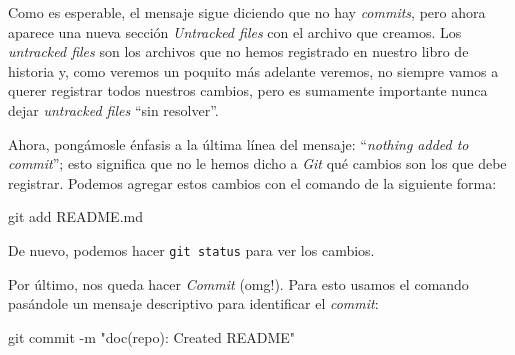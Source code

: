     Como es esperable, el mensaje sigue diciendo que no hay \textit{commits}, pero ahora aparece
    una nueva sección \textit{Untracked files} con el archivo que creamos.
    Los \textit{untracked files} son los archivos que no hemos registrado en nuestro libro de
    historia y, como veremos un poquito más adelante veremos, no siempre vamos a querer registrar
    todos nuestros cambios, pero es sumamente importante nunca dejar \textit{untracked files} 
    \enquote{sin resolver}.

    Ahora, pongámosle énfasis a la última línea del mensaje: \enquote{\textit{nothing added to 
    commit}}; esto significa que no le hemos dicho a \textit{Git} qué cambios son los que debe 
    registrar.
    Podemos agregar estos cambios con el comando  de la siguiente forma:

    \begin{bash}
      git add README.md
    \end{bash}

    De nuevo, podemos hacer \texttt{git status} para ver los cambios.

    Por último, nos queda hacer \textit{Commit} (omg!).
    Para esto usamos el comando  pasándole un mensaje descriptivo para 
    identificar el \textit{commit}:

    \begin{bash}
      git commit -m "doc(repo): Created README"
    \end{bash}
